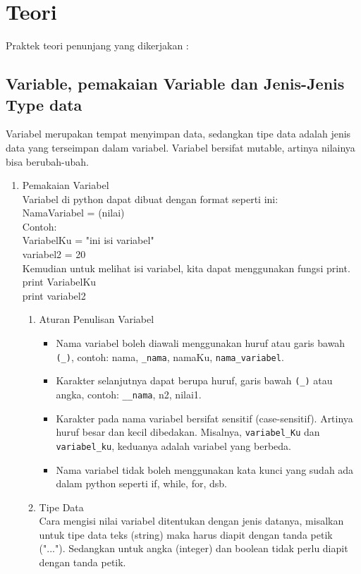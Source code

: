 \section{Teori}
Praktek teori penunjang yang dikerjakan :
\subsection{Variable, pemakaian Variable dan Jenis-Jenis Type data}
Variabel merupakan tempat menyimpan data, sedangkan tipe data adalah jenis data yang terseimpan dalam variabel. Variabel bersifat mutable, artinya nilainya bisa berubah-ubah.
\begin{enumerate}
\item Pemakaian Variabel\\
Variabel di python dapat dibuat dengan format seperti ini:\\
NamaVariabel = (nilai)\\
Contoh:\\
VariabelKu = "ini isi variabel"\\
variabel2 = 20\\
Kemudian untuk melihat isi variabel, kita dapat menggunakan fungsi print.\\
print VariabelKu\\
print variabel2\\
\begin{enumerate}
\item Aturan Penulisan Variabel
\begin{itemize}
\item Nama variabel boleh diawali menggunakan huruf atau garis bawah \verb|(_)|, contoh: nama, \verb|_nama|, namaKu, \verb|nama_variabel|.
\item Karakter selanjutnya dapat berupa huruf, garis bawah \verb|(_)| atau angka, contoh: \verb|__nama|, n2, nilai1.
\item Karakter pada nama variabel bersifat sensitif (case-sensitif). Artinya huruf besar dan kecil dibedakan. Misalnya, \verb|variabel_Ku| dan \verb|variabel_ku|, keduanya adalah variabel yang berbeda.
\item Nama variabel tidak boleh menggunakan kata kunci yang sudah ada dalam python seperti if, while, for, dsb.
\end{itemize}
\item Tipe Data\\
Cara mengisi nilai variabel ditentukan dengan jenis datanya, misalkan untuk tipe data teks (string) maka harus diapit dengan tanda petik ("..."). Sedangkan untuk angka (integer) dan boolean tidak perlu diapit dengan tanda petik.\\

\end{enumerate}
\end{enumerate}
